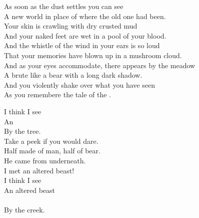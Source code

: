 
\label{album:murder-of-the-universe}





As soon as the dust settles you can see \\
A new world in place of where the old one had been. \\

Your skin is crawling with dry crusted mud \\
And your naked feet are wet in a pool of your blood. \\

And the whistle of the wind in your ears is so loud \\
That your memories have blown up in a mushroom cloud. \\

And as your eyes accommodate, there appears by the meadow \\
A brute like a bear with a long dark shadow. \\

And you violently shake over what you have seen \\
As you remembere the tale of the . \\





I think I see \\
An  \\
By the tree. \\

Take a peek if you would dare. \\
Half made of man, half of bear. \\

He came from underneath. \\
I met an altered beast! \\

I think I see \\
An altered beast \\ \\
By the creek. \\


